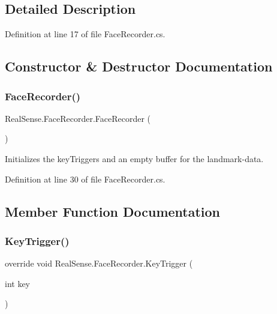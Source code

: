 \subsection{Detailed Description}


Definition at line 17 of file Face\+Recorder.\+cs.



\subsection{Constructor \& Destructor Documentation}
\mbox{\label{class_real_sense_1_1_face_recorder_a782589b2a536a93d548f1efab49c6bcd}} 
\subsubsection{\texorpdfstring{Face\+Recorder()}{FaceRecorder()}}
{\footnotesize\ttfamily Real\+Sense.\+Face\+Recorder.\+Face\+Recorder (\begin{DoxyParamCaption}{ }\end{DoxyParamCaption})}

Initializes the key\+Triggers and an empty buffer for the landmark-\/data. 

Definition at line 30 of file Face\+Recorder.\+cs.



\subsection{Member Function Documentation}
\mbox{\label{class_real_sense_1_1_face_recorder_a315985241eb6c21f6393d8104a967eb6}} 
\subsubsection{\texorpdfstring{Key\+Trigger()}{KeyTrigger()}}
{\footnotesize\ttfamily override void Real\+Sense.\+Face\+Recorder.\+Key\+Trigger (\begin{DoxyParamCaption}\item[{int}]{key }\end{DoxyParamCaption})\hspace{0.3cm}{\ttfamily [virtual]}}

